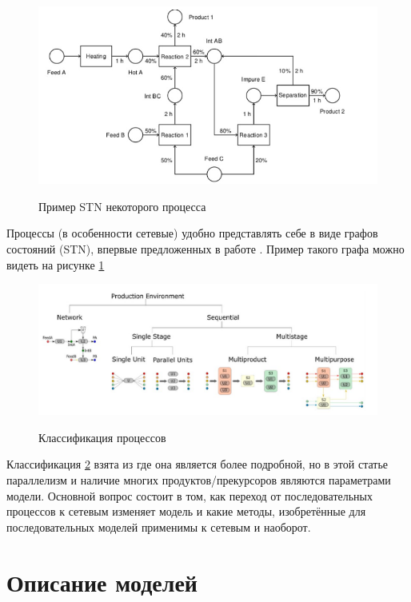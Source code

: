 \documentclass[12pt, twoside]{article}
\theoremstyle{definition}
\begin{document}
\begin{figure}[h]
\caption{Пример STN некоторого процесса}
\centering
\includegraphics[width=1.0\textwidth]{пример процесса}
\label{fig:stn_exmp}
\end{figure}

Процессы (в особенности сетевые) удобно представлять себе в виде графов состояний (STN), впервые предложенных в работе \cite{stnoriginal}. Пример такого графа можно видеть на рисунке \ref{fig:stn_exmp}

\begin{figure}[h]
\caption{Классификация процессов}
\centering
\includegraphics[width=1.0\textwidth]{классификация процессов}
\label{fig:clas_proc}
\end{figure}

Классификация \ref{fig:clas_proc} взята из \cite{reallife} где она является более подробной, но в этой статье параллелизм и наличие многих продуктов/прекурсоров являются параметрами модели. Основной вопрос состоит в том, как переход от последовательных процессов к сетевым изменяет модель и какие методы, изобретённые для последовательных моделей применимы к сетевым и наоборот. 

\section{Описание моделей}
\end{document}
